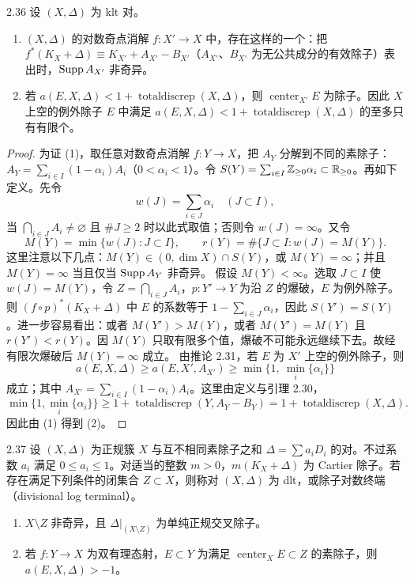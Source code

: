 
\begin{propositionp}{2.36}
设 $(X,\Delta)$ 为 klt 对。
\begin{enumerate}[label=（\arabic*）,leftmargin=2.6em,itemsep=1pt]
\item $(X,\Delta)$ 的对数奇点消解 $f\colon X'\to X$ 中，存在这样的一个：把 $f^*(K_X+\Delta)\equiv K_{X'}+A_{X'}-B_{X'}$（$A_{X'}$、$B_{X'}$ 为无公共成分的有效除子）表出时，$\operatorname{Supp} A_{X'}$ 非奇异。
\item 若 $a(E,X,\Delta)<1+\operatorname{totaldiscrep}(X,\Delta)$，则 $\operatorname{center}_{X'}E$ 为除子。因此 $X$ 上空的例外除子 $E$ 中满足 $a(E,X,\Delta)<1+\operatorname{totaldiscrep}(X,\Delta)$ 的至多只有有限个。
\end{enumerate}
\end{propositionp}
\begin{proof}
为证 (1)，取任意对数奇点消解 $f\colon Y\to X$，把 $A_Y$ 分解到不同的素除子：$A_Y=\sum_{i\in I}(1-\alpha_i)A_i$（$0<\alpha_i<1$）。令 $S(Y)=\sum_{i\in I}\mathbb{Z}_{\ge0}\alpha_i\subset\mathbb{R}_{\ge0}$。再如下定义。先令
\[
w(J)=\sum_{i\in J}\alpha_i\quad(J\subset I),
\]
当 $\bigcap_{i\in J}A_i\ne\varnothing$ 且 $\#J\ge2$ 时以此式取值；否则令 $w(J)=\infty$。又令
\[
M(Y)=\min\{w(J):J\subset I\},\qquad r(Y)=\#\{J\subset I:w(J)=M(Y)\}.
\]
这里注意以下几点：$M(Y)\in(0,\dim X)\cap S(Y)$，或 $M(Y)=\infty$；并且 $M(Y)=\infty$ 当且仅当 $\operatorname{Supp} A_Y$ 非奇异。
假设 $M(Y)<\infty$。选取 $J\subset I$ 使 $w(J)=M(Y)$，令 $Z=\bigcap_{i\in J}A_i$，$p\colon Y'\to Y$ 为沿 $Z$ 的爆破，$E$ 为例外除子。则 $(f\circ p)^*(K_X+\Delta)$ 中 $E$ 的系数等于 $1-\sum_{i\in J}\alpha_i$，因此 $S(Y')=S(Y)$。进一步容易看出：或者 $M(Y')>M(Y)$，或者 $M(Y')=M(Y)$ 且 $r(Y')<r(Y)$。因 $M(Y)$ 只取有限多个值，爆破不可能永远继续下去。故经有限次爆破后 $M(Y)=\infty$ 成立。
由推论 2.31，若 $E$ 为 $X'$ 上空的例外除子，则
\[
a(E,X,\Delta)\ge a(E,X',A_{X'})\ge\min\bigl\{1,\ \min_i\{\alpha_i\}\bigr\}
\]
成立；其中 $A_{X'}=\sum_{i\in I}(1-\alpha_i)A_i$。这里由定义与引理 2.30，
\[
\min\bigl\{1,\min_i\{\alpha_i\}\bigr\}\ge1+\operatorname{totaldiscrep}(Y,A_Y-B_Y)=1+\operatorname{totaldiscrep}(X,\Delta).
\]
因此由 (1) 得到 (2)。
\end{proof}

\begin{definition}{2.37}
设 $(X,\Delta)$ 为正规簇 $X$ 与互不相同素除子之和 $\Delta=\sum a_iD_i$ 的对。不过系数 $a_i$ 满足 $0\le a_i\le1$。对适当的整数 $m>0$，$m(K_X+\Delta)$ 为 Cartier 除子。若存在满足下列条件的闭集合 $Z\subset X$，则称对 $(X,\Delta)$ 为 dlt，或除子对数终端（divisional log terminal）。
\begin{enumerate}[label=（\arabic*）,leftmargin=2.6em,itemsep=1pt]
\item $X\setminus Z$ 非奇异，且 $\Delta|_{(X\setminus Z)}$ 为单纯正规交叉除子。
\item 若 $f\colon Y\to X$ 为双有理态射，$E\subset Y$ 为满足 $\operatorname{center}_XE\subset Z$ 的素除子，则 $a(E,X,\Delta)>-1$。
\end{enumerate}
\end{definition}

